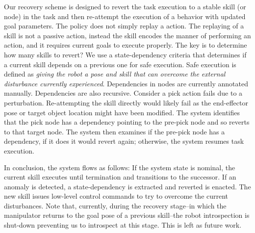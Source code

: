 \documentclass[letterpaper, 10 pt, conference]{ieeeconf}  %
\begin{document}
Our recovery scheme is designed to revert the task execution to a stable skill (or node) in the task and then re-attempt the execution of a behavior with updated goal parameters. The policy does not simply replay a action. The replaying of a skill is not a passive action, instead the skill encodes the manner of performing an action, and it requires current goals to execute properly. The key is to determine how many skills to revert? 
We use a state-dependency criteria that determines if a current skill depends on a previous one for safe execution. Safe execution is defined as \textit{giving the robot a pose and skill that can overcome the external disturbance currently experienced}. Dependencies in nodes are currently annotated manually. Dependencies are also recursive. Consider a pick action fails due to a perturbation. Re-attempting the skill directly would likely fail as the end-effector pose or target object location might have been modified. The system identifies that the pick node has a dependency pointing to the pre-pick node and so reverts to that target node. The system then examines if the pre-pick node has a dependency, if it does it would revert again; otherwise, the system resumes task execution.

In conclusion, the system flows as follows: If the system state is nominal, the current skill executes until termination and transitions to the successor. If an anomaly is detected, a state-dependency is extracted and reverted is enacted. The new skill issues low-level control commands to try to overcome the current disturbances. Note that, currently, during the recovery stage--in which the manipulator returns to the goal pose of a previous skill--the robot introspection is shut-down preventing us to introspect at this stage. This is left as future work. 
\end{document}
